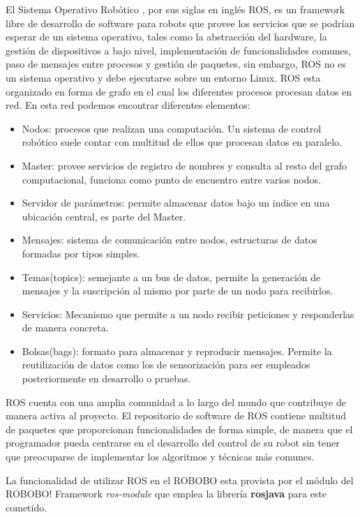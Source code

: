 El Sistema Operativo Robótico\cite{Ros} , por sus siglas en inglés ROS, es un framework libre de desarrollo de software para robots que provee los servicios que se podrían esperar de un sistema operativo, tales como la abstracción del hardware, la gestión de dispositivos a bajo nivel, implementación de funcionalidades comunes, paso de mensajes entre procesos y gestión de paquetes, sin embargo, ROS no es un sistema operativo y debe ejecutarse sobre un entorno Linux.
ROS esta organizado en forma de grafo en el cual los diferentes procesos procesan datos en red. En esta red podemos encontrar diferentes elementos:
\begin{itemize}
	\item Nodos: procesos que realizan una computación. Un sistema de control robótico suele contar con multitud de ellos que procesan datos en paralelo.
	\item Master: provee servicios de registro de nombres y consulta al resto del grafo computacional, funciona como punto de encuentro entre varios nodos.
	
	\item Servidor de parámetros: permite almacenar datos bajo un indice en una ubicación central, es parte del Master.
	\item Mensajes: sistema de comunicación entre nodos, estructuras de datos formadas por tipos simples.
	\item Temas(topics): semejante a un bus de datos, permite la generación de mensajes y la suscripción al mismo por parte de un nodo para recibirlos.
	\item Servicios: Mecanismo que permite a un nodo recibir peticiones y responderlas de manera concreta.
	\item Bolsas(bags): formato para almacenar y reproducir mensajes. Permite la reutilización de datos como los de sensorización para ser empleados posteriormente en desarrollo o pruebas.
\end{itemize}

ROS cuenta con una amplia comunidad a lo largo del mundo que contribuye de manera activa al proyecto. 
El repositorio de software de ROS contiene multitud de paquetes que proporcionan funcionalidades de forma simple, de manera que el programador pueda centrarse en el desarrollo del control de su robot sin tener que preocuparse de implementar los algoritmos y técnicas más comunes.

La funcionalidad de utilizar ROS en el ROBOBO esta provista por el módulo del ROBOBO! Framework \textit{ros-module} que  emplea la librería \textbf{rosjava} para este cometido.











 